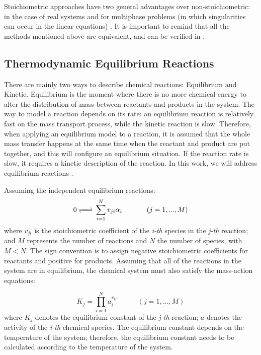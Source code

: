 Stoichiometric approaches have two general advantages over non-stoichiometric: in the case of real systems and for multiphase problems (in which singularities can occur in the linear equations) \cite{Smith:80}. It is important to remind that all the methods mentioned above are equivalent, and can be verified in \cite{Zeggeren:70}.


\subsection{Thermodynamic Equilibrium Reactions}
There are mainly two ways to describe chemical reactions: Equilibrium and Kinetic. Equilibrium is the moment where there is no more chemical energy to alter the distribution of mass between reactants and products in the system. The way to model a reaction depends on its rate: an equilibrium reaction is relatively fast on the mass transport process, while the kinetic reaction is slow. Therefore, when applying an equilibrium model to a reaction, it is assumed that the whole mass transfer happens at the same time when the reactant and product are put together, and this will configure an equilibrium situation. If the reaction rate is slow, it requires a kinetic description of the reaction. In this work, we will address equilibrium reactions \cite{Nordstrom:86}. 

Assuming the independent equilibrium reactions:
\begin{equation}\label{reaction}
0 \ce{<=>} \sum\limits_{i=1}^N  v_{ji} \alpha_i \hspace{35pt}    (j = 1, ... , M)
\end{equation}
where $v_{ji}$ is the stoichiometric coefficient of the \emph{i-th} species in the \emph{j-th} reaction; and $M$ represents the number of reactions and $N$ the number of species, with $M < N$. The sign convention is to assign negative stoichiometric coefficients for reactants and positive for products. Assuming that all of the reactions in the system are in equilibrium, the chemical system must also satisfy the mass-action equations:

\begin{equation}\label{eq:massaction}
K_j =  \prod\limits_{i=1}^N  a_i^{v_{ij}} \hspace{35pt}    (j = 1, ... , M)
\end{equation}
where $K_j$ denotes the equilibrium constant of the \emph{j-th} reaction; $a$ denotes the activity of the \emph{i-th} chemical species. The equilibrium constant depends on the temperature of the system; therefore, the equilibrium constant needs to be calculated according to the temperature of the system. 

